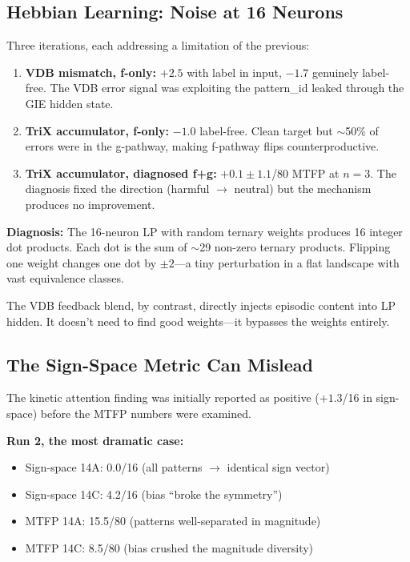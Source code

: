 \documentclass[11pt,letterpaper]{article}
\begin{document}
\subsection{Hebbian Learning: Noise at 16 Neurons}
\label{sec:hebbian}

Three iterations, each addressing a limitation of the previous:

\begin{enumerate}
\item \textbf{VDB mismatch, f-only:} $+2.5$ with label in input, $-1.7$ genuinely label-free. The VDB error signal was exploiting the pattern\_id leaked through the GIE hidden state.

\item \textbf{TriX accumulator, f-only:} $-1.0$ label-free. Clean target but $\sim$50\% of errors were in the g-pathway, making f-pathway flips counterproductive.

\item \textbf{TriX accumulator, diagnosed f+g:} $+0.1 \pm 1.1$/80 MTFP at $n=3$. The diagnosis fixed the direction (harmful $\to$ neutral) but the mechanism produces no improvement.
\end{enumerate}

\textbf{Diagnosis:} The 16-neuron LP with random ternary weights produces 16 integer dot products. Each dot is the sum of $\sim$29 non-zero ternary products. Flipping one weight changes one dot by $\pm 2$---a tiny perturbation in a flat landscape with vast equivalence classes.

The VDB feedback blend, by contrast, directly injects episodic content into LP hidden. It doesn't need to find good weights---it bypasses the weights entirely.

\subsection{The Sign-Space Metric Can Mislead}
\label{sec:sign-artifact}

The kinetic attention finding was initially reported as positive ($+1.3$/16 in sign-space) before the MTFP numbers were examined.

\textbf{Run 2, the most dramatic case:}
\begin{itemize}
\item Sign-space 14A: 0.0/16 (all patterns $\to$ identical sign vector)
\item Sign-space 14C: 4.2/16 (bias ``broke the symmetry'')
\item MTFP 14A: 15.5/80 (patterns well-separated in magnitude)
\item MTFP 14C: 8.5/80 (bias crushed the magnitude diversity)
\end{itemize}
\end{document}
